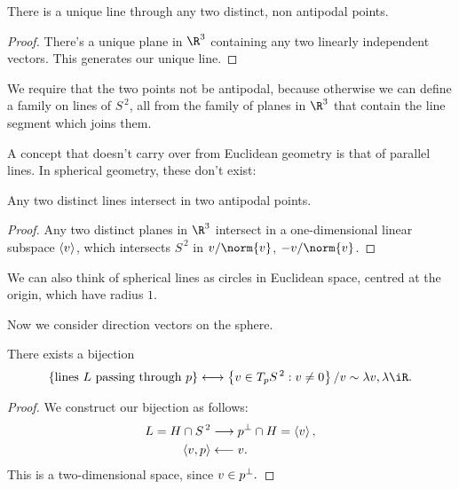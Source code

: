 \begin{proposition}
	There is a unique line through any two distinct, non antipodal points. %
\end{proposition}

\begin{proof}
	There's a unique plane in $\R^3$ containing any two linearly independent vectors. This generates our unique line. %
\end{proof}

We require that the two points not be antipodal, because otherwise we can define a family on lines of $S^{\,2}$, all from the family of planes in $\R^3$ that contain the line segment which joins them.

A concept that doesn't carry over from Euclidean geometry is that of parallel lines. In spherical geometry, these don't exist:

\begin{proposition}
	Any two distinct lines intersect in two antipodal points. %
\end{proposition}

\begin{proof}
	Any two distinct planes in $\R^3$ intersect in a one-dimensional linear subspace $\left\langle v \right\rangle$, which intersects $S^{\,2}$ in $\vv/\norm{\vv}$, $-\vv/\norm{\vv}$. %
\end{proof}

We can also think of spherical lines as circles in Euclidean space, centred at the origin, which have radius $1$.

	\pagebreak

Now we consider direction vectors on the sphere.

\begin{proposition}
	There exists a bijection %
	\begin{equation*}
		\left\{\text{lines $L$ passing through $\pp$}\right\}
		\longleftrightarrow
		\left\{ \vv \in T_{\pp} S^{\,2} : \vv \neq 0\right\} /
		\vv \sim \lambda \vv, \lambda\iR.
	\end{equation*}
\end{proposition}

\begin{proof}
	We construct our bijection as follows: %
	\begin{align*}
		L = H \cap S^{\,2} & \longrightarrow p^\perp \cap H = \left\langle v \right\rangle, \\
		\left\langle v,p \right\rangle & \longleftarrow v.
	\end{align*}
	This is a two-dimensional space, since $v\in p^\perp.$
\end{proof}

